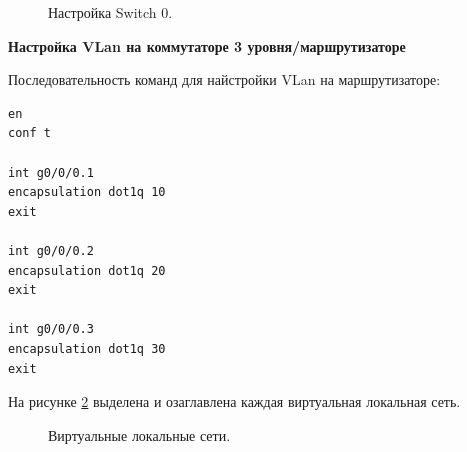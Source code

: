 \documentclass[a4paper,14pt]{article}
\begin{document}
\begin{figure}[!h]
    \caption{Настройка Switch 0.}
    \label{fig:sw_vlan}
\end{figure}

\textbf{Настройка VLan на коммутаторе 3 уровня/маршрутизаторе}

Последовательность команд для найстройки VLan на маршрутизаторе:

\begin{lstlisting}
en
conf t

int g0/0/0.1
encapsulation dot1q 10
exit

int g0/0/0.2
encapsulation dot1q 20
exit

int g0/0/0.3
encapsulation dot1q 30
exit
\end{lstlisting}

На рисунке \ref{fig:sch} выделена и озаглавлена каждая виртуальная локальная сеть.

\begin{figure}[!h]
    \caption{Виртуальные локальные сети.}
    \label{fig:sch}
\end{figure}
\end{document}
